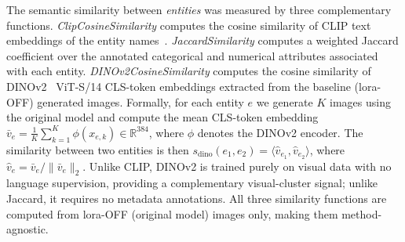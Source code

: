 %
%

The semantic similarity between \textit{entities} was measured by three complementary
functions.
%
\textit{ClipCosineSimilarity} computes the cosine similarity of CLIP text embeddings
of the entity names~\cite{Radford2021Clip}.
%
\textit{JaccardSimilarity} computes a weighted Jaccard coefficient over the annotated
categorical and numerical attributes associated with each entity.
%
\textit{DINOv2CosineSimilarity} computes the cosine similarity of DINOv2~\cite{oquab2023dinov2}
ViT-S/14 CLS-token embeddings extracted from the baseline (lora-OFF) generated images.
Formally, for each entity $e$ we generate $K$ images using the original model
and compute the mean CLS-token embedding
$\bar{v}_e = \frac{1}{K}\sum_{k=1}^{K} \phi(x_{e,k}) \in \mathbb{R}^{384}$,
where $\phi$ denotes the DINOv2 encoder.
The similarity between two entities is then
$s_\text{dino}(e_1, e_2) = \langle \hat{v}_{e_1}, \hat{v}_{e_2} \rangle$,
where $\hat{v}_e = \bar{v}_e / \|\bar{v}_e\|_2$.
Unlike CLIP, DINOv2 is trained purely on visual data with no language supervision,
providing a complementary visual-cluster signal; unlike Jaccard, it requires no
metadata annotations.
All three similarity functions are computed from lora-OFF (original model) images only,
making them method-agnostic.

%
